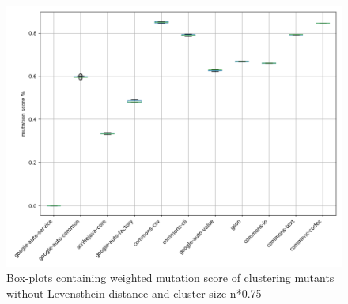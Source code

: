 \documentclass[../../main]{subfiles}
\begin{document}
\begin{figure}[H]
\includegraphics[width=\textwidth]{images/boxplot_summary/boxplot_hc_no_distance_0.75.png}
\caption{\label{box:clustering_no_distance_75}Box-plots containing weighted mutation score of clustering mutants without Levensthein distance and cluster size n*0.75}
\end{figure}
\end{document}
